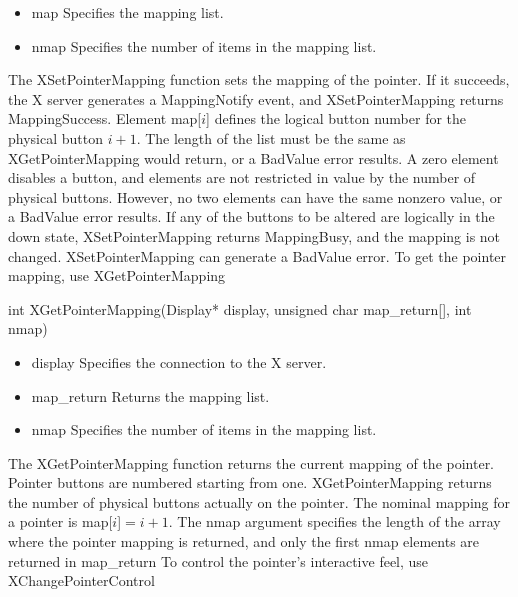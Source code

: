 \documentclass{report}
\begin{document}
\begin{itemize}
\begin{itemize}
\begin{itemize}
                \item map Specifies the mapping list.
                \item nmap Specifies the number of items in the mapping list.
            \end{itemize}
            The XSetPointerMapping function sets the mapping of the pointer. If it succeeds, the X server generates a MappingNotify event, and XSetPointerMapping returns MappingSuccess. Element map[$i$] defines the logical button number for the physical button $i+1$. The length of the list must be the same as XGetPointerMapping would return, or a BadValue error results. A zero element disables a button, and elements are not restricted in value by the number of physical buttons. However, no two elements can have the same nonzero value, or a BadValue error results. If any of the buttons to be altered are logically in the down state, XSetPointerMapping returns MappingBusy, and the mapping is not changed.
            \bigbreak \noindent 
            XSetPointerMapping can generate a BadValue error.
            \bigbreak \noindent 
            To get the pointer mapping, use XGetPointerMapping
            \bigbreak \noindent 
            \begin{cppcode}
                int XGetPointerMapping(Display* display, unsigned char map_return[], int nmap)
            \end{cppcode}
            \bigbreak \noindent
            \begin{itemize}
                \item display Specifies the connection to the X server.
                \item map\_return Returns the mapping list.
                \item nmap Specifies the number of items in the mapping list.
            \end{itemize}
            The XGetPointerMapping function returns the current mapping of the pointer. Pointer buttons are numbered starting from one. XGetPointerMapping returns the number of physical buttons actually on the pointer. The nominal mapping for a pointer is map[$i$]$=i+1$. The nmap argument
            \bigbreak \noindent 
            specifies the length of the array where the pointer mapping is returned, and only the first nmap elements are returned in map\_return
            \bigbreak \noindent 
            To control the pointer’s interactive feel, use XChangePointerControl
            \bigbreak \noindent 
            \begin{cppcode}

\end{cppcode}
\end{itemize}
\end{itemize}
\end{document}
